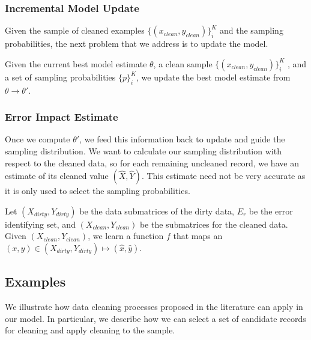 \subsubsection{Incremental Model Update}
Given the sample of cleaned examples $\{(x_{clean},y_{clean})\}^K_i$ and the sampling probabilities, the next problem that we address is to update the model.

\begin{problem}\label{imp-update}\sloppy
Given the current best model estimate $\theta$, a clean sample $\{(x_{clean},y_{clean})\}^K_i$ , and a set of sampling probabilities $\{p\}^K_i$, we update the best model estimate from $\theta \rightarrow \theta'$.
\end{problem}

\subsubsection{Error Impact Estimate}
Once we compute $\theta'$, we feed this information back to update and guide the sampling distribution.
We want to calculate our sampling distribution with respect to the cleaned data, so for each remaining uncleaned record, we have an estimate of its cleaned value $(\hat{X},\hat{Y})$.
This estimate need not be very accurate as it is only used to select the sampling probabilities.

\begin{problem}\label{imp-est}\sloppy
Let $(X_{dirty},Y_{dirty})$ be the data submatrices of the dirty data, $E_r$ be the error identifying set, and $(X_{clean},Y_{clean})$ be the submatrices for the cleaned data. Given $(X_{clean},Y_{clean})$, we learn a function $f$ that maps an $(x,y) \in (X_{dirty},Y_{dirty}) \mapsto (\hat{x},\hat{y})$.
\end{problem}
\fi

\subsection{Examples}
We illustrate how data cleaning processes proposed in the literature can apply in our model.
In particular, we describe how we can select a set of candidate records for cleaning and apply cleaning to the sample.

